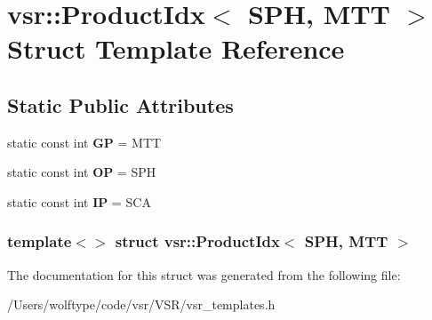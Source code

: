 \hypertarget{structvsr_1_1_product_idx_3_01_s_p_h_00_01_m_t_t_01_4}{\section{vsr\-:\-:Product\-Idx$<$ S\-P\-H, M\-T\-T $>$ Struct Template Reference}
\label{structvsr_1_1_product_idx_3_01_s_p_h_00_01_m_t_t_01_4}
}
\subsection*{Static Public Attributes}
\begin{DoxyCompactItemize}
\item 
\hypertarget{structvsr_1_1_product_idx_3_01_s_p_h_00_01_m_t_t_01_4_a9bbbc0c2bbc877efcb6be26383b2deb2}{static const int {\bfseries G\-P} = M\-T\-T}\label{structvsr_1_1_product_idx_3_01_s_p_h_00_01_m_t_t_01_4_a9bbbc0c2bbc877efcb6be26383b2deb2}

\item 
\hypertarget{structvsr_1_1_product_idx_3_01_s_p_h_00_01_m_t_t_01_4_ac203e0329ab71ea8ab474efec3c700dd}{static const int {\bfseries O\-P} = S\-P\-H}\label{structvsr_1_1_product_idx_3_01_s_p_h_00_01_m_t_t_01_4_ac203e0329ab71ea8ab474efec3c700dd}

\item 
\hypertarget{structvsr_1_1_product_idx_3_01_s_p_h_00_01_m_t_t_01_4_a8595b7414c5522f355d32c1051abddec}{static const int {\bfseries I\-P} = S\-C\-A}\label{structvsr_1_1_product_idx_3_01_s_p_h_00_01_m_t_t_01_4_a8595b7414c5522f355d32c1051abddec}

\end{DoxyCompactItemize}
\subsubsection*{template$<$$>$ struct vsr\-::\-Product\-Idx$<$ S\-P\-H, M\-T\-T $>$}



The documentation for this struct was generated from the following file\-:\begin{DoxyCompactItemize}
\item 
/\-Users/wolftype/code/vsr/\-V\-S\-R/vsr\-\_\-templates.\-h\end{DoxyCompactItemize}
